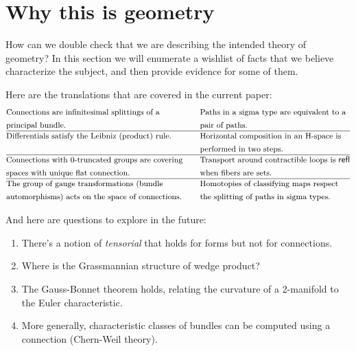 \section{Why this is geometry}

How can we double check that we are describing the intended theory of geometry? In this section we will enumerate a wishlist of facts that we believe characterize the subject, and then provide evidence for some of them.

Here are the translations that are covered in the current paper:
\begin{align*}
& \text{\small Connections are infinitesimal splittings of a} & \quad &\text{\small Paths in a sigma type are equivalent to a}        \\
& \text{\small principal bundle.} & \quad&\text{\small pair of paths.}        \\ \hline
& \text{\small Differentials satisfy the Leibniz (product) rule.} &\quad  &\text{\small Horizontal composition in an H-space is} \\ 
&  &  \quad&\text{\small performed in two steps.} \\ \hline
& \text{\small Connections with 0-truncated groups are covering}        &\quad &\text{\small Transport around contractible loops is } \mathsf{refl}             \\ 
& \text{\small spaces with unique flat connection.}        & \quad&\text{\small when fibers are sets.}             \\ \hline
& \text{\small The group of gauge transformations (bundle} &\quad &\text{\small Homotopies of classifying maps respect } \\ 
& \text{\small automorphisms) acts on the space of connections.} & \quad&\text{\small the splitting of paths in sigma types.} \\ 
\end{align*}

And here are questions to explore in the future:
\begin{enumerate}
\item There's a notion of \emph{tensorial} that holds for forms but not for connections.
\item Where is the Grassmannian structure of wedge product?
\item The Gauss-Bonnet theorem holds, relating the curvature of a 2-manifold to the Euler characteristic.
\item More generally, characteristic classes of bundles can be computed using a connection (Chern-Weil theory).
\end{enumerate}

